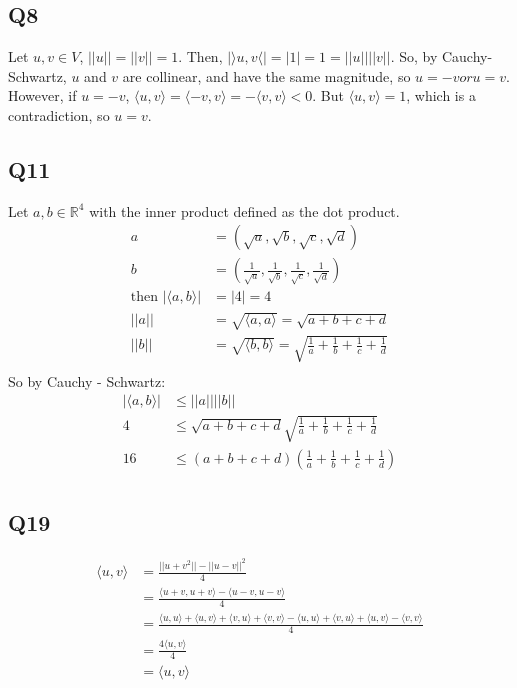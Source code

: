 \documentclass{article}
\begin{document}
\subsection*{Q8}
Let $u, v \in V$, $||u|| = ||v|| = 1$. Then, $|\rangle u, v \langle| = |1| = 1 = ||u|| ||v||$. So, by Cauchy-Schwartz, $u$ and $v$ are collinear, and have the same magnitude, so $u = -v or u = v$. However, if $u = -v$, $\langle u, v \rangle = \langle -v, v \rangle = - \langle v, v \rangle < 0$. But $\langle u, v \rangle = 1$, which is a contradiction, so $u = v$.

\subsection*{Q11}
Let $a,b \in \mathbb{R}^4$ with the inner product defined as the dot product. 
\begin{align*}
	a &= (\sqrt{a}, \sqrt{b}, \sqrt{c}, \sqrt{d})\\
	b &= (\frac{1}{\sqrt{a}}, \frac{1}{\sqrt{b}}, \frac{1}{\sqrt{c}},\frac{1}{\sqrt{d}})\\
	\text{then } |\langle a, b \rangle| &= |4| = 4\\ 
	||a|| &= \sqrt{\langle a, a \rangle} = \sqrt{a + b + c + d}\\
	||b|| &= \sqrt{\langle b, b \rangle} = \sqrt{\frac{1}{a} + \frac{1}{b} + \frac{1}{c} + \frac{1}{d}}\\
\end{align*}
So by Cauchy - Schwartz:
\begin{align*}
	|\langle a, b \rangle| &\leq ||a|| ||b||\\
	4 &\leq \sqrt{a + b + c + d} \sqrt{\frac{1}{a} + \frac{1}{b} + \frac{1}{c} + \frac{1}{d}}\\
	16 &\leq (a+b+c+d)(\frac{1}{a} + \frac{1}{b}+ \frac{1}{c}+\frac{1}{d})\\
\end{align*}
\subsection*{Q19}
\begin{align*}
	\langle u, v \rangle &= \frac{||u+v^2|| - ||u-v||^2}{4}\\
	&= \frac{\langle u+v, u+v \rangle - \langle u-v, u-v \rangle}{4}\\
	&= \frac{\langle u, u \rangle + \langle u , v \rangle + \langle v, u \rangle + \langle v, v \rangle - \langle u, u \rangle + \langle v, u \rangle + \langle u, v \rangle - \langle v, v \rangle}{4}\\
	&= \frac{4\langle u , v \rangle}{4}\\\
	&= \langle u, v \rangle
\end{align*}
\end{document}
